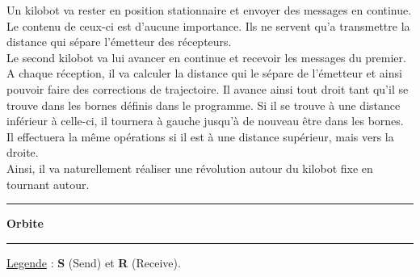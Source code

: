 \documentclass[a4paper,8pt]{report}
\begin{document}
Un kilobot va rester en position stationnaire et envoyer des messages en continue. Le contenu de ceux-ci est d'aucune importance. Ils ne servent qu'a transmettre la distance qui sépare l’émetteur des récepteurs.\\
Le second kilobot va lui avancer en continue et recevoir les messages du premier. A chaque réception, il va calculer la distance qui le sépare de l'émetteur et ainsi pouvoir faire des corrections de trajectoire. Il avance ainsi tout droit tant qu'il se trouve dans les bornes définis dans le programme. Si il se trouve à une distance inférieur à celle-ci, il tournera à gauche jusqu’à de nouveau être dans les bornes. Il effectuera la même opérations si il est à une distance supérieur, mais vers la droite.\\
Ainsi, il va naturellement réaliser une révolution autour du kilobot fixe en tournant autour.\\

\begin{center}
  \rule{\linewidth}{.5pt}
  \textbf{Orbite}\\
  \rule{\linewidth}{.5pt}
\end{center}
\underline{Legende} : \textbf{S} (Send) et \textbf{R} (Receive).\\
\end{document}
